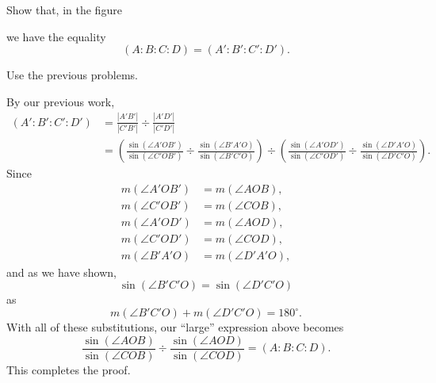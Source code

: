\documentclass{ximera}
\begin{document}
\begin{problem}\label{50}
Show that, in the figure%
\begin{image}
\end{image}
we have the equality%
\[
\left(  A:B:C:D\right)  =\left(A':B':C':D'\right)  .
\]


\begin{hint}
Use the previous problems. 
\end{hint}

\begin{freeResponse}
By our previous work, 
\begin{align*}
(A':B':C':D') &=\frac{|A'B'|}{|C'B'|}\div \frac{|A'D'|}{|C'D'|}\\
&=\left(\frac{\sin(\angle A'OB')}{\sin(\angle C'OB')} \div \frac{\sin(\angle B'A'O)}{\sin(\angle B'C'O)}\right) \div \left(\frac{\sin(\angle A'OD')}{\sin(\angle C'OD')}\div\frac{\sin(\angle D'A'O)}{\sin(\angle D'C'O)}\right).
\end{align*}
Since 
\begin{align*}
m(\angle A'OB') &= m(\angle AOB),\\
m(\angle C'OB') &= m(\angle COB),\\
m(\angle A'OD') &= m(\angle AOD),\\
m(\angle C'OD') &= m(\angle COD),\\
m(\angle B'A'O) &= m(\angle D'A'O),
\end{align*}
and as we have shown, 
\[
\sin(\angle B'C'O) = \sin(\angle D'C'O)
\]
as 
\[
m(\angle B'C'O) + m(\angle D'C'O) = 180^\circ.
\]
With all of these substitutions, our ``large'' expression above becomes
\[
\frac{\sin(\angle AOB)}{\sin(\angle COB)} \div \frac{\sin(\angle AOD)}{\sin(\angle COD)} = (A:B:C:D). 
\]
This completes the proof. 
\end{freeResponse}
\end{problem}
\end{document}
